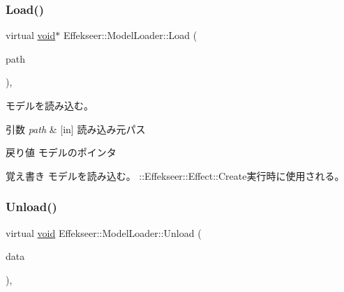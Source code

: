 \subsubsection{\texorpdfstring{Load()}{Load()}}
{\footnotesize\ttfamily virtual \mbox{\hyperlink{namespace_effekseer_ab34c4088e512200cf4c2716f168deb56}{void}}$\ast$ Effekseer\+::\+Model\+Loader\+::\+Load (\begin{DoxyParamCaption}\item[{const \mbox{\hyperlink{_effekseer_8h_aca7eb5de6dd019c19ac58ea35a193f2f}{E\+F\+K\+\_\+\+C\+H\+AR}} $\ast$}]{path }\end{DoxyParamCaption})\hspace{0.3cm}{\ttfamily [inline]}, {\ttfamily [virtual]}}



モデルを読み込む。 


\begin{DoxyParams}{引数}
{\em path} & \mbox{[}in\mbox{]} 読み込み元パス \\
\hline
\end{DoxyParams}
\begin{DoxyReturn}{戻り値}
モデルのポインタ 
\end{DoxyReturn}
\begin{DoxyNote}{覚え書き}
モデルを読み込む。 \+::\+Effekseer\+::\+Effect\+::\+Create実行時に使用される。 
\end{DoxyNote}
\mbox{\label{class_effekseer_1_1_model_loader_a496f93a8615363ff31943adb205b5365}} 
\subsubsection{\texorpdfstring{Unload()}{Unload()}}
{\footnotesize\ttfamily virtual \mbox{\hyperlink{namespace_effekseer_ab34c4088e512200cf4c2716f168deb56}{void}} Effekseer\+::\+Model\+Loader\+::\+Unload (\begin{DoxyParamCaption}\item[{\mbox{\hyperlink{namespace_effekseer_ab34c4088e512200cf4c2716f168deb56}{void}} $\ast$}]{data }\end{DoxyParamCaption})\hspace{0.3cm}{\ttfamily [inline]}, {\ttfamily [virtual]}}



